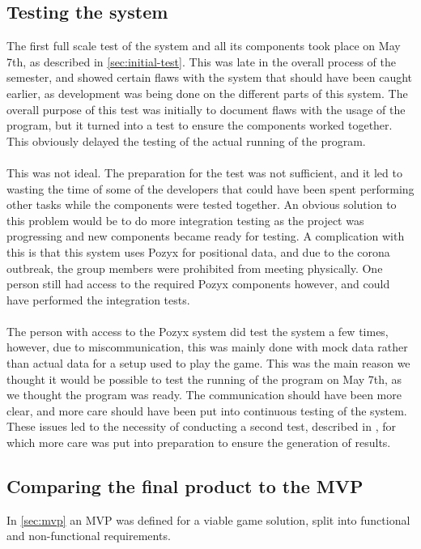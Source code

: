 \subsection{Testing the system}
The first full scale test of the system and all its components took place on May 7th, as described in \autoref{sec:initial-test}.
This was late in the overall process of the semester, and showed certain flaws with the system that should have been caught earlier, as development was being done on the different parts of this system.
The overall purpose of this test was initially to document flaws with the usage of the program, but it turned into a test to ensure the components worked together.
This obviously delayed the testing of the actual running of the program.
\\\\
This was not ideal.
The preparation for the test was not sufficient, and it led to wasting the time of some of the developers that could have been spent performing other tasks while the components were tested together.
An obvious solution to this problem would be to do more integration testing as the project was progressing and new components became ready for testing.
A complication with this is that this system uses Pozyx for positional data, and due to the corona outbreak, the group members were prohibited from meeting physically.
One person still had access to the required Pozyx components however, and could have performed the integration tests.
\\\\
The person with access to the Pozyx system did test the system a few times, however, due to miscommunication, this was mainly done with mock data rather than actual data for a setup used to play the game.
This was the main reason we thought it would be possible to test the running of the program on May 7th, as we thought the program was ready.
The communication should have been more clear, and more care should have been put into continuous testing of the system.
These issues led to the necessity of conducting a second test, described in , for which more care was put into preparation to ensure the generation of results.

\subsection{Comparing the final product to the MVP}
In \autoref{sec:mvp} an MVP was defined for a viable game solution, split into functional and non-functional requirements.

